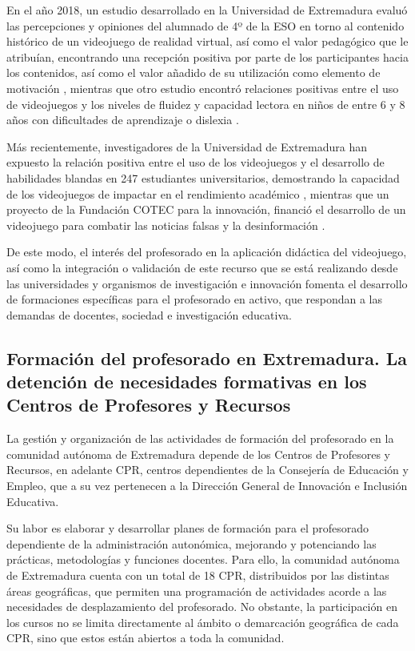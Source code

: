 \documentclass[spanish]{textolivre}
\begin{document}
En el año 2018, un estudio desarrollado en la Universidad de Extremadura evaluó las percepciones y opiniones del alumnado de 4º de la ESO en torno al contenido histórico de un videojuego de realidad virtual, así como el valor pedagógico que le atribuían, encontrando una recepción positiva por parte de los participantes hacia los contenidos, así como el valor añadido de su utilización como elemento de motivación \cite{martinezsoto2018evaluacion}, mientras que otro estudio encontró relaciones positivas entre el uso de videojuegos y los niveles de fluidez y capacidad lectora en niños de entre 6 y 8 años con dificultades de aprendizaje o dislexia \cite{jimenez2018impacto}.

Más recientemente, investigadores de la Universidad de Extremadura han expuesto la relación positiva entre el uso de los videojuegos y el desarrollo de habilidades blandas en 247 estudiantes universitarios, demostrando la capacidad de los videojuegos de impactar en el rendimiento académico \cite{alloza2022genre}, mientras que un proyecto de la Fundación COTEC para la innovación, financió el desarrollo de un videojuego para combatir las noticias falsas y la desinformación \cite{cotec2022anuario}.

De este modo, el interés del profesorado en la aplicación didáctica del videojuego, así como la integración o validación de este recurso que se está realizando desde las universidades y organismos de investigación e innovación fomenta el desarrollo de formaciones específicas para el profesorado en activo, que respondan a las demandas de docentes, sociedad e investigación educativa.

\subsection{Formación del profesorado en Extremadura. La detención de necesidades formativas en los Centros de Profesores y Recursos}

La gestión y organización de las actividades de formación del profesorado en la comunidad autónoma de Extremadura depende de los Centros de Profesores y Recursos, en adelante CPR, centros dependientes de la Consejería de Educación y Empleo, que a su vez pertenecen a la Dirección General de Innovación e Inclusión Educativa.

Su labor es elaborar y desarrollar planes de formación para el profesorado dependiente de la administración autonómica, mejorando y potenciando las prácticas, metodologías y funciones docentes. Para ello, la comunidad autónoma de Extremadura cuenta con un total de 18 CPR, distribuidos por las distintas áreas geográficas, que permiten una programación de actividades acorde a las necesidades de desplazamiento del profesorado. No obstante, la participación en los cursos no se limita directamente al ámbito o demarcación geográfica de cada CPR, sino que estos están abiertos a toda la comunidad.
\end{document}

